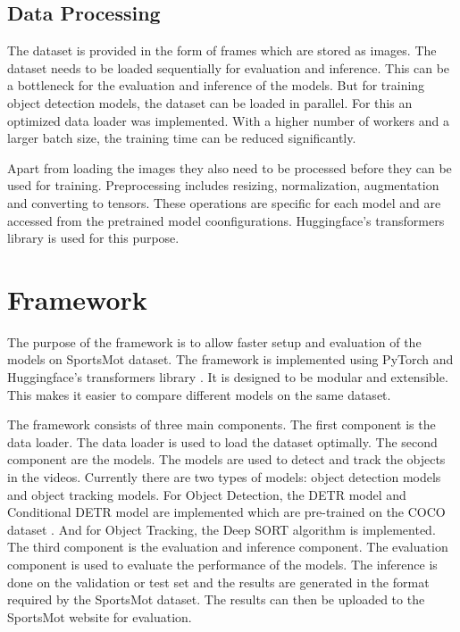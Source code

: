 \documentclass[runningheads]{llncs}
\begin{document}
\subsection{Data Processing}
The dataset is provided in the form of frames which are stored as images.
The dataset needs to be loaded sequentially for evaluation and inference.
This can be a bottleneck for the evaluation and inference of the models.
But for training object detection models, the dataset can be loaded in parallel.
For this an optimized data loader was implemented.
With a higher number of workers and a larger batch size, the training time can be reduced significantly.

Apart from loading the images they also need to be processed before they can be used for training.
Preprocessing includes resizing, normalization, augmentation and converting to tensors.
These operations are specific for each model and are accessed from the pretrained model coonfigurations.
Huggingface's transformers library \cite{wolf-etal-2020-transformers} is used for this purpose.


\section{Framework}
The purpose of the framework is to allow faster setup and evaluation of the models on SportsMot dataset.
The framework is implemented using PyTorch \cite{pytorch2019} and Huggingface's transformers library \cite{wolf-etal-2020-transformers}.
It is designed to be modular and extensible.
This makes it easier to compare different models on the same dataset.

The framework consists of three main components.
The first component is the data loader.
The data loader is used to load the dataset optimally.
The second component are the models.
The models are used to detect and track the objects in the videos.
Currently there are two types of models: object detection models and object tracking models.
For Object Detection, the DETR model \cite{detr2020} and Conditional DETR model \cite{conditionaldetr2021} are implemented which are pre-trained on the COCO dataset \cite{coco2014}.
And for Object Tracking, the Deep SORT algorithm \cite{DBLP:journals/corr/abs-1907-03465} is implemented.
The third component is the evaluation and inference component.
The evaluation component is used to evaluate the performance of the models.
The inference is done on the validation or test set and the results are generated in the format required by the SportsMot dataset.
The results can then be uploaded to the SportsMot website for evaluation.
\end{document}
